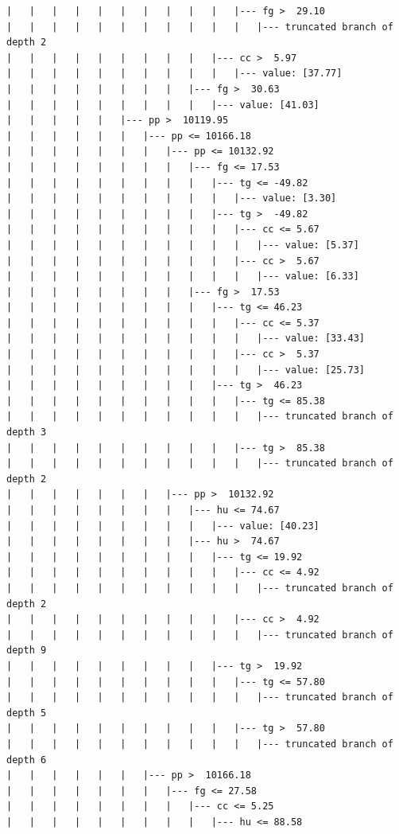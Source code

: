\documentclass[UTF8, a4paper]{ctexart}
\begin{document}
\begin{lstlisting}
|   |   |   |   |   |   |   |   |   |   |--- fg >  29.10
|   |   |   |   |   |   |   |   |   |   |   |--- truncated branch of depth 2
|   |   |   |   |   |   |   |   |   |--- cc >  5.97
|   |   |   |   |   |   |   |   |   |   |--- value: [37.77]
|   |   |   |   |   |   |   |   |--- fg >  30.63
|   |   |   |   |   |   |   |   |   |--- value: [41.03]
|   |   |   |   |   |--- pp >  10119.95
|   |   |   |   |   |   |--- pp <= 10166.18
|   |   |   |   |   |   |   |--- pp <= 10132.92
|   |   |   |   |   |   |   |   |--- fg <= 17.53
|   |   |   |   |   |   |   |   |   |--- tg <= -49.82
|   |   |   |   |   |   |   |   |   |   |--- value: [3.30]
|   |   |   |   |   |   |   |   |   |--- tg >  -49.82
|   |   |   |   |   |   |   |   |   |   |--- cc <= 5.67
|   |   |   |   |   |   |   |   |   |   |   |--- value: [5.37]
|   |   |   |   |   |   |   |   |   |   |--- cc >  5.67
|   |   |   |   |   |   |   |   |   |   |   |--- value: [6.33]
|   |   |   |   |   |   |   |   |--- fg >  17.53
|   |   |   |   |   |   |   |   |   |--- tg <= 46.23
|   |   |   |   |   |   |   |   |   |   |--- cc <= 5.37
|   |   |   |   |   |   |   |   |   |   |   |--- value: [33.43]
|   |   |   |   |   |   |   |   |   |   |--- cc >  5.37
|   |   |   |   |   |   |   |   |   |   |   |--- value: [25.73]
|   |   |   |   |   |   |   |   |   |--- tg >  46.23
|   |   |   |   |   |   |   |   |   |   |--- tg <= 85.38
|   |   |   |   |   |   |   |   |   |   |   |--- truncated branch of depth 3
|   |   |   |   |   |   |   |   |   |   |--- tg >  85.38
|   |   |   |   |   |   |   |   |   |   |   |--- truncated branch of depth 2
|   |   |   |   |   |   |   |--- pp >  10132.92
|   |   |   |   |   |   |   |   |--- hu <= 74.67
|   |   |   |   |   |   |   |   |   |--- value: [40.23]
|   |   |   |   |   |   |   |   |--- hu >  74.67
|   |   |   |   |   |   |   |   |   |--- tg <= 19.92
|   |   |   |   |   |   |   |   |   |   |--- cc <= 4.92
|   |   |   |   |   |   |   |   |   |   |   |--- truncated branch of depth 2
|   |   |   |   |   |   |   |   |   |   |--- cc >  4.92
|   |   |   |   |   |   |   |   |   |   |   |--- truncated branch of depth 9
|   |   |   |   |   |   |   |   |   |--- tg >  19.92
|   |   |   |   |   |   |   |   |   |   |--- tg <= 57.80
|   |   |   |   |   |   |   |   |   |   |   |--- truncated branch of depth 5
|   |   |   |   |   |   |   |   |   |   |--- tg >  57.80
|   |   |   |   |   |   |   |   |   |   |   |--- truncated branch of depth 6
|   |   |   |   |   |   |--- pp >  10166.18
|   |   |   |   |   |   |   |--- fg <= 27.58
|   |   |   |   |   |   |   |   |--- cc <= 5.25
|   |   |   |   |   |   |   |   |   |--- hu <= 88.58

\end{lstlisting}
\end{document}
